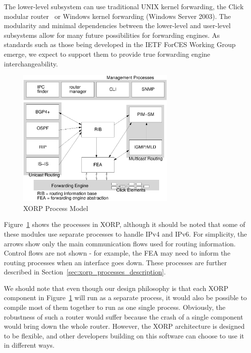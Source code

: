 \documentclass[11pt]{article}
\begin{document}
The lower-level subsystem can use traditional UNIX kernel forwarding,
the Click modular router~\cite{CLICK-PROJECT} or Windows kernel
forwarding (Windows Server 2003). The modularity and minimal
dependencies between the lower-level and user-level subsystems allow for
many future possibilities for forwarding engines.  As standards such as
those being developed in the IETF ForCES Working Group emerge, we expect
to support them to provide true forwarding engine interchangeability.

\begin{figure}[htbp]
  \begin{center}
    \includegraphics[width=0.7\textwidth]{figs/processes3.ps}
    \caption{XORP Process Model}
    \label{fig:process_model}
  \end{center}
\end{figure}

Figure~\ref{fig:process_model} shows the processes in XORP, although
it should be noted that some of these modules use separate processes
to handle IPv4 and IPv6. For simplicity, the arrows show only the
main communication flows used for routing information.  Control flows
are not shown - for example, the FEA may need to inform the routing
processes when an interface goes down. These processes are further
described in Section~\ref{sec:xorp_processes_description}.

We should note that even though our design philosophy is that each
XORP component in Figure~\ref{fig:process_model} will run as a
separate process, it would also be possible to compile most of them
together to run as one single process. Obviously, the robustness of
such a router would suffer because the crash of a single component
would bring down the whole router. However, the XORP architecture is
designed to be flexible, and other developers building on this
software can choose to use it in different ways.
\end{document}
